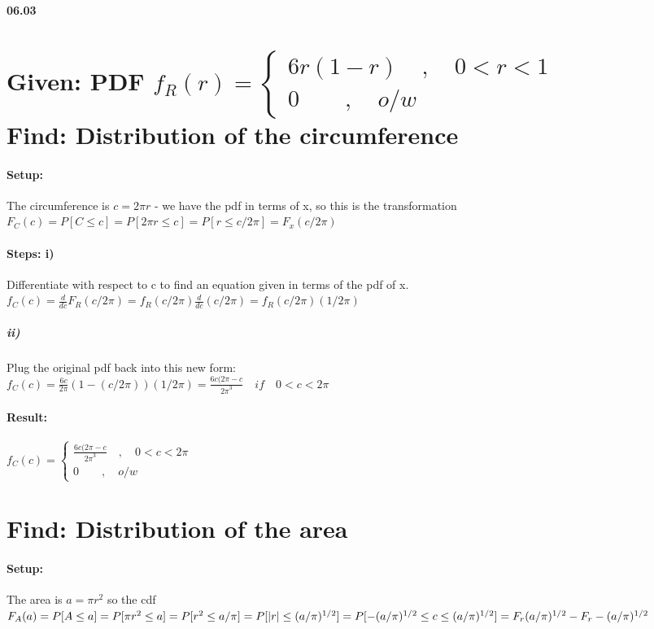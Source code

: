 
{\bf 06.03} 

\section*{Given: PDF ${ f }_{ R }(r)=\begin{cases} 6r(1-r) \quad ,\quad 0<{r}<1 \\ 0\quad  \quad ,\quad o/w \end{cases}$\\ Find: Distribution of the circumference}

\paragraph{Setup:} The circumference is $c=2\pi r$ - we have the pdf in terms of x, so this is the transformation\\ ${ F }_{ C }(c)=P[C\le c]=P[2\pi r\le c]=P[r \le c/2 \pi] ={F}_{x}(c/2 \pi)$

\paragraph{Steps: i)} Differentiate with respect to c to find an equation given in terms of the pdf of x.\\ ${ f }_{ C }(c)= \frac{d}{dc} {F}_{R}(c/2\pi)={f}_{R}(c/2\pi)\frac{d}{dc}(c/2\pi)={f}_{R}(c/2\pi)(1/2\pi)$


\subparagraph{ii)}Plug the original pdf back into this new form:\\ ${ f }_{ C }(c)= \frac{6c}{2\pi}(1-(c/2\pi))(1/2\pi)=\frac {6c(2\pi-c}{{2\pi}^{3}} \quad if \quad 0<c<2\pi$

\paragraph{Result:} ${ f }_{ C }(c)=\begin{cases} \frac {6c(2\pi-c}{{2\pi}^{3}} \quad , \quad 0<c<2\pi  \\ 0\quad  \quad ,\quad o/w \end{cases}$

\section*{Find: Distribution of the area }

\paragraph{Setup:} The area is $a=\pi{r}^{2}$ so the cdf ${ F }_{ A }(a)=P[A\le a]=P[\pi{r}^{2}\le a]=P[{r}^{2}\le a/\pi]\\=P[\left|r \right| \le (a/\pi)^{1/2} ]=P[-(a/\pi)^{1/2}\le c \le(a/\pi)^{1/2}]= {F}_{r}(a/\pi)^{1/2}-{F}_{r}-(a/\pi)^{1/2}$

